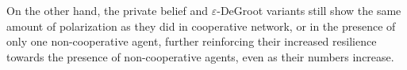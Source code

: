 \documentclass[a4paper, 12pt]{report}
\begin{document}
On the other hand, the private belief and $\varepsilon$-DeGroot variants still show the same amount of polarization as they did in cooperative network, or in the presence of only one non-cooperative agent, further reinforcing their increased resilience towards the presence of non-cooperative agents, even as their numbers increase.

\begin{figure}[!htbp]
    \centering
    

\end{figure}
\end{document}

